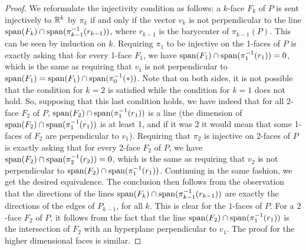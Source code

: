 \begin{proof}
	We reformulate the injectivity condition as follows:
	a $k$-face $F_k$ of $P$ is sent injectively to $\mathbb{R}^k$ by $\pi_k$ if and only if the vector $v_k$ is not perpendicular to the line $\operatorname{\mathrm{span}}(F_k) \cap \operatorname{\mathrm{span}}(\pi_{k-1}^{-1}(r_{k-1}))$, where $r_{k-1}$ is the barycenter of $\pi_{k-1}(P)$.
	This can be seen by induction on $k$.
	Requiring $\pi_1$ to be injective on the 1-faces of $P$ is exactly asking that for every 1-face $F_1$, we have $\operatorname{\mathrm{span}}(F_1)\cap \operatorname{\mathrm{span}}(\pi_{1}^{-1}(r_{1}))=0$, which is the same as requiring that $v_1$ is not perpendicular to $\operatorname{\mathrm{span}}(F_1)=\operatorname{\mathrm{span}}(F_1)\cap \operatorname{\mathrm{span}}(\pi_{0}^{-1}(*))$.
	Note that on both sides, it is not possible that the condition for $k=2$ is satisfied while the condition for $k=1$ does not hold.
	So, supposing that this last condition holds, we have indeed that for all 2-face $F_2$ of $P$, $\operatorname{\mathrm{span}}(F_2)\cap \operatorname{\mathrm{span}}(\pi_{1}^{-1}(r_{1}))$ is a line (the dimension of $\operatorname{\mathrm{span}}(F_2)\cap \operatorname{\mathrm{span}}(\pi_{1}^{-1}(r_{1}))$ is at least 1, and if it was 2 it would mean that some 1-faces of $F_2$ are perpendicular to $v_1$).
	Requiring that $\pi_2$ is injective on 2-faces of $P$ is exactly asking that for every 2-face $F_2$ of $P$, we have $\operatorname{\mathrm{span}}(F_2)\cap \operatorname{\mathrm{span}}(\pi_{2}^{-1}(r_{2}))=0$, which is the same as requiring that $v_2$ is not perpendicular to $\operatorname{\mathrm{span}}(F_2)\cap \operatorname{\mathrm{span}}(\pi_{1}^{-1}(r_{1}))$.
	Continuing in the same fashion, we get the desired equivalence.
	The conclusion then follows from the observation that the directions of the lines $\operatorname{\mathrm{span}}(F_k) \cap \operatorname{\mathrm{span}}(\pi_{k-1}^{-1}(r_{k-1}))$ are exactly the directions of the edges of $P_{k-1}$, for all $k$.
	This is clear for the $1$-faces of $P$.
	For a $2$-face $F_2$ of $P$, it follows from the fact that the line $\operatorname{\mathrm{span}}(F_2)\cap \operatorname{\mathrm{span}}(\pi_{1}^{-1}(r_{1}))$ is the intersection of $F_2$ with an hyperplane perpendicular to $v_1$.
	The proof for the higher dimensional faces is similar.
\end{proof}